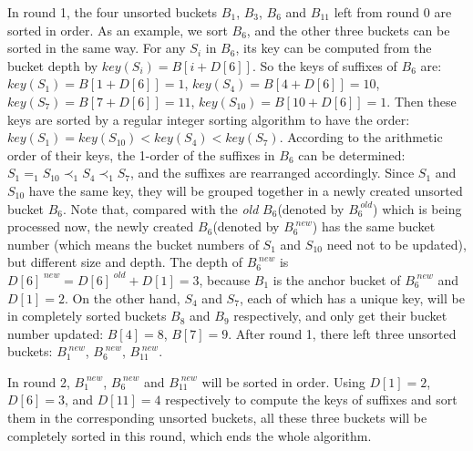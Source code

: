 \documentclass{ws-ijprai}
\begin{document}
In round 1, the four unsorted buckets $B_1$, $B_3$, $B_6$ and $B_{11}$
left from round 0 are sorted in order. As an example, we sort $B_6$,
and the other three buckets can be sorted in the same way. For any
$S_i$ in $B_6$, its key can be computed from the bucket depth by
$key(S_i) = B[i+D[6]]$. So the keys of suffixes of $B_6$ are:
$key(S_1) = B[1+D[6]] = 1$, $key(S_4) = B[4+D[6]] = 10$, $key(S_7) =
B[7+D[6]] = 11$, $key(S_{10}) = B[10+D[6]] = 1$. Then these keys are
sorted by a regular integer sorting algorithm to have the order: $key(S_1) = key(S_{10})
< key(S_4) < key(S_7)$.  According to the arithmetic order of their
keys, the 1-order of the suffixes in $B_6$ can be determined: $S_1 =_
1 S_{10} \prec_1 S_4 \prec_1 S_7$, and the suffixes are rearranged
accordingly. Since $S_1$ and $S_{10}$ have the same key, they will be
grouped together in a newly created unsorted bucket $B_6$. Note that,
compared with the \emph{old} $B_6$(denoted by $B_6^{\;old}$) which is
being processed now, the newly created $B_6$(denoted by $B_6^{\;new}$)
has the same bucket number (which means the bucket numbers of $S_1$ and
$S_{10}$ need not to be updated), but different size and depth. The
depth of $B_6^{\;new}$ is $D[6]^{\;new} = D[6]^{\;old} + D[1] = 3$,
because $B_1$ is the anchor bucket of $B_6^{\;new}$ and $D[1] = 2$.
On the other hand, $S_4$ and $S_7$, each of which has a unique key,
will be in completely sorted buckets $B_8$ and $B_9$ respectively, and
only get their bucket number updated: $B[4] = 8$, $B[7] = 9$.  After
round 1, there left three unsorted buckets: $B_1^{\;new}$,
$B_6^{\;new}$, $B_{11}^{\;new}$.

 In round 2, $B_1^{\;new}$, $B_6^{\;new}$ and $B_{11}^{\;new}$ will be
sorted in order. Using $D[1] = 2$, $D[6] = 3$, and $D[11] = 4$
respectively to compute the keys of suffixes and sort them in the
corresponding unsorted buckets, all these three buckets will be
completely sorted in this round, which ends the whole algorithm.
\end{document}
